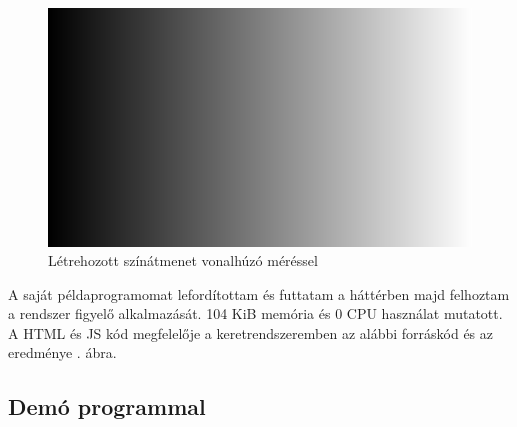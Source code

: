 \begin{figure}[h!]
    \centering
    \includegraphics[width=8truecm]{images/gradient_native.png}
    \caption{Létrehozott színátmenet vonalhúzó méréssel}
    \label{fig:gradient}
\end{figure}

\pagebreak


A saját példaprogramomat lefordítottam és futtatam a háttérben majd felhoztam a rendszer figyelő alkalmazását. 104 KiB memória és 0 CPU használat mutatott. A HTML és JS kód megfelelője a keretrendszeremben az alábbi forráskód és az eredménye . ábra.

\subsection{Demó programmal}

